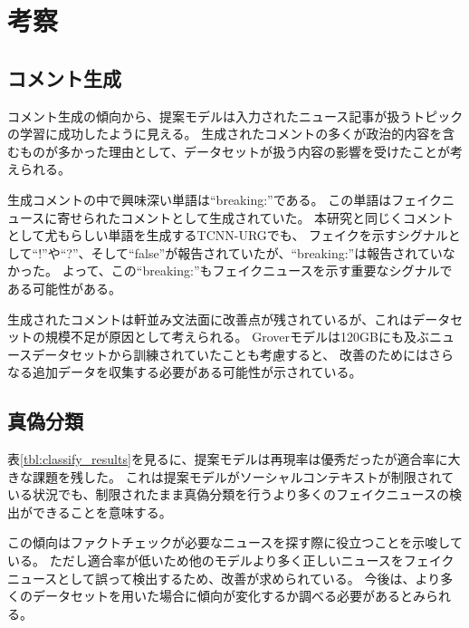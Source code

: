\section{考察}
\subsection{コメント生成}
コメント生成の傾向から、提案モデルは入力されたニュース記事が扱うトピックの学習に成功したように見える。
生成されたコメントの多くが政治的内容を含むものが多かった理由として、データセットが扱う内容の影響を受けたことが考えられる。

生成コメントの中で興味深い単語は``breaking:''である。
この単語はフェイクニュースに寄せられたコメントとして生成されていた。
本研究と同じくコメントとして尤もらしい単語を生成するTCNN-URG\cite{ijcai2018-533}でも、
フェイクを示すシグナルとして``!''や``?''、そして``false''が報告されていたが、``breaking:''は報告されていなかった。
よって、この``breaking:''もフェイクニュースを示す重要なシグナルである可能性がある。

生成されたコメントは軒並み文法面に改善点が残されているが、これはデータセットの規模不足が原因として考えられる。
Groverモデルは120GBにも及ぶニュースデータセットから訓練されていた\cite{NIPS2019_9106}ことも考慮すると、
改善のためにはさらなる追加データを収集する必要がある可能性が示されている。

\subsection{真偽分類}
表\ref{tbl:classify_results}を見るに、提案モデルは再現率は優秀だったが適合率に大きな課題を残した。
これは提案モデルがソーシャルコンテキストが制限されている状況でも、制限されたまま真偽分類を行うより多くのフェイクニュースの検出ができることを意味する。

この傾向はファクトチェックが必要なニュースを探す際に役立つことを示唆している。
ただし適合率が低いため他のモデルより多く正しいニュースをフェイクニュースとして誤って検出するため、改善が求められている。
今後は、より多くのデータセットを用いた場合に傾向が変化するか調べる必要があるとみられる。
